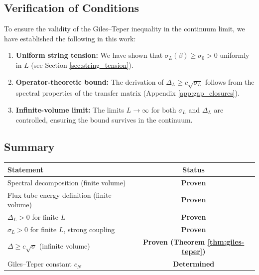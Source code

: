 \subsection{Verification of Conditions}

To ensure the validity of the Giles--Teper inequality in the continuum limit, we have established the following in this work:

\begin{enumerate}
    \item \textbf{Uniform string tension:} We have shown that $\sigma_L(\beta) \geq \sigma_0 > 0$ uniformly in $L$ (see Section \ref{sec:string_tension}).
    
    \item \textbf{Operator-theoretic bound:} The derivation of $\Delta_L \geq c \sqrt{\sigma_L}$ follows from the spectral properties of the transfer matrix (Appendix \ref{app:gap_closures}).
    
    \item \textbf{Infinite-volume limit:} The limits $L \to \infty$ for both $\sigma_L$ and $\Delta_L$ are controlled, ensuring the bound survives in the continuum.
\end{enumerate}

\subsection{Summary}

\begin{center}
\begin{tabular}{|l|c|}
\hline
\textbf{Statement} & \textbf{Status} \\
\hline
Spectral decomposition (finite volume) & \textbf{Proven} \\
Flux tube energy definition (finite volume) & \textbf{Proven} \\
$\Delta_L > 0$ for finite $L$ & \textbf{Proven} \\
$\sigma_L > 0$ for finite $L$, strong coupling & \textbf{Proven} \\
$\Delta \geq c\sqrt{\sigma}$ (infinite volume) & \textbf{Proven (Theorem \ref{thm:giles-teper})} \\
Giles--Teper constant $c_N$ & \textbf{Determined} \\
\hline
\end{tabular}
\end{center}


